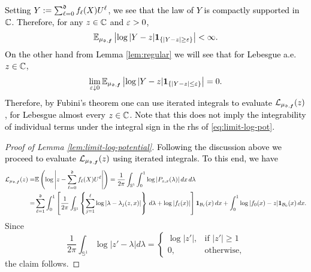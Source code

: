 \documentclass{amsart}
\numberwithin{equation}{section}
\def\corABrev{\textcolor{black}}
\newcommand{\abbr}[1]{{\sc\lowercase{#1}}}
\begin{document}
\corABrev{Setting $Y:= \sum_{\ell=0}^{\mathfrak{d}} f_\ell(X)U^\ell$, we see that the law of $Y$ is compactly supported in $\mathbb{C}$. Therefore, for any $z \in \mathbb{C}$ and $\varepsilon >0$,
\[
\mathbb E_{\mu_{\mathfrak{d}, {\bm f}}} \left|\log |Y - z| {\bf 1}_{\{|Y-z| \ge \varepsilon\}} \right| < \infty.
\]
On the other hand from Lemma \ref{lem:regular} we will see that for Lebesgue a.e.~$z \in \mathbb{C}$,
\[
\lim_{\varepsilon \downarrow 0}\mathbb E_{\mu_{\mathfrak{d}, {\bm f}}} \left|\log |Y - z| {\bf 1}_{\{|Y-z| \le \varepsilon\}} \right| =0.
\]
Therefore, by Fubini's theorem one can use iterated integrals to evaluate $\mathcal{L}_{\mu_{\mathfrak{d}, {\bm f}}}(z)$, for Lebesgue almost every $z \in \mathbb{C}$. Note that this does not imply the integrability of individual terms under the integral sign in the \abbr{RHS} of \eqref{eq:limit-log-pot}.}
\begin{proof}[Proof of Lemma \ref{lem:limit-log-potential}]
  \corABrev{Following the discussion above we proceed to evaluate $\mathcal{L}_{\mu_{\mathfrak{d}, {\bm f}}}(z)$ using iterated integrals. To this end, we have}
\begin{align*}
\mathcal{L}_{\mu_{\mathfrak{d}, {\bm f}}}(z)
= & \mathbb E\left( \log \left|z - \sum_{\ell=0}^{\mathfrak{d}} f_\ell(X) U^\ell \right|\right)
= \frac{1}{2\pi}\int_{\mathbb{S}^1} \int_0^1 \log |P_{z,x}(\lambda)| \, dx \, d \lambda  \\
= & \sum_{\ell=1}^{\mathfrak{d}} \int_0^1\left[\frac{1}{2\pi} \int_{\mathbb{S}^1}  \left\{\sum_{j=1}^\ell \log| \lambda - \lambda_j(z,x)|  \right\}  \, d \lambda + \log |f_\ell(x)|\right] {\bf 1}_{\mathcal{B}_\ell}(x) \, dx +  \int_0^1\log |f_0(x) -z| {\bf 1}_{\mathcal{B}_0}(x) \, dx.
\end{align*}
Since
\[
\frac{1}{2\pi}\int_{\mathbb{S}^1} \log |z'- \lambda| d \lambda = \left\{\begin{array}{ll} \log |z'|, & \mbox{if } |z'| \ge 1\\
0, & \mbox{otherwise,}
\end{array}
\right.
\]
the claim follows.
\end{proof}


\end{document}
